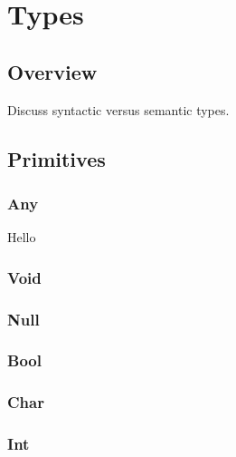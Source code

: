\chapter{Types}
\section{Overview}
Discuss syntactic versus semantic types.
\section{Primitives}
\subsection{Any}

\begin{center}
\end{center}

\begin{syntax}
  Hello
\end{syntax}


\subsection{Void}
\subsection{Null}
\subsection{Bool}
\subsection{Char}
\subsection{Int}
